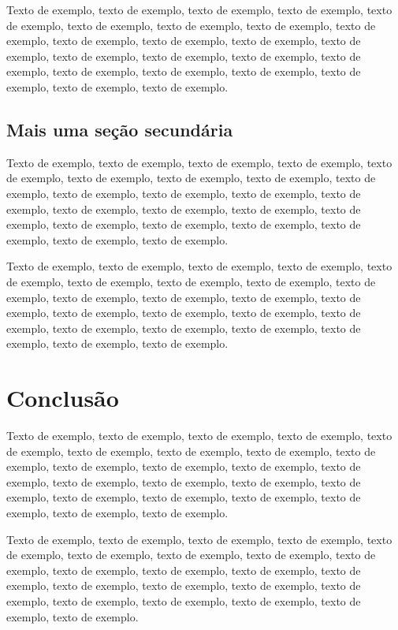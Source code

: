 \documentclass[
	12pt,				%
	oneside,			%
	a4paper,			%
	english,			%
	brazil				%
	]{abntex2ppgsi}
\begin{document}
Texto de exemplo, texto de exemplo, texto de exemplo, texto de exemplo, texto de exemplo, texto de exemplo, texto de exemplo, texto de exemplo, texto de exemplo, texto de exemplo, texto de exemplo, texto de exemplo, texto de exemplo, texto de exemplo, texto de exemplo, texto de exemplo, texto de exemplo, texto de exemplo, texto de exemplo, texto de exemplo, texto de exemplo, texto de exemplo, texto de exemplo.

\section{Mais uma seção secundária}

Texto de exemplo, texto de exemplo, texto de exemplo, texto de exemplo, texto de exemplo, texto de exemplo, texto de exemplo, texto de exemplo, texto de exemplo, texto de exemplo, texto de exemplo, texto de exemplo, texto de exemplo, texto de exemplo, texto de exemplo, texto de exemplo, texto de exemplo, texto de exemplo, texto de exemplo, texto de exemplo, texto de exemplo, texto de exemplo, texto de exemplo.

Texto de exemplo, texto de exemplo, texto de exemplo, texto de exemplo, texto de exemplo, texto de exemplo, texto de exemplo, texto de exemplo, texto de exemplo, texto de exemplo, texto de exemplo, texto de exemplo, texto de exemplo, texto de exemplo, texto de exemplo, texto de exemplo, texto de exemplo, texto de exemplo, texto de exemplo, texto de exemplo, texto de exemplo, texto de exemplo, texto de exemplo.

\chapter{Conclusão}

Texto de exemplo, texto de exemplo, texto de exemplo, texto de exemplo, texto de exemplo, texto de exemplo, texto de exemplo, texto de exemplo, texto de exemplo, texto de exemplo, texto de exemplo, texto de exemplo, texto de exemplo, texto de exemplo, texto de exemplo, texto de exemplo, texto de exemplo, texto de exemplo, texto de exemplo, texto de exemplo, texto de exemplo, texto de exemplo, texto de exemplo.

Texto de exemplo, texto de exemplo, texto de exemplo, texto de exemplo, texto de exemplo, texto de exemplo, texto de exemplo, texto de exemplo, texto de exemplo, texto de exemplo, texto de exemplo, texto de exemplo, texto de exemplo, texto de exemplo, texto de exemplo, texto de exemplo, texto de exemplo, texto de exemplo, texto de exemplo, texto de exemplo, texto de exemplo, texto de exemplo.
\end{document}
